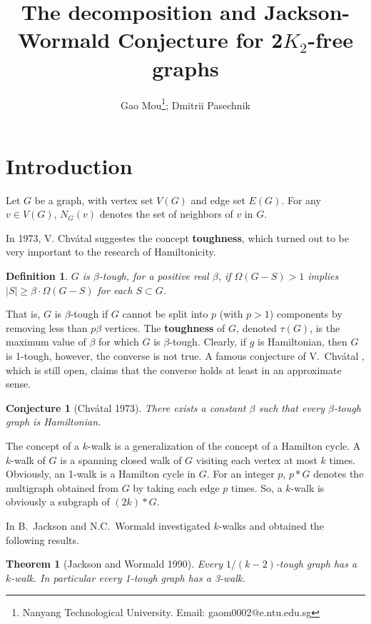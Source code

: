 \documentclass[12pt]{article}
\author{Gao Mou\thanks{Nanyang Technological University. Email: gaom0002@e.ntu.edu.sg}; Dmitrii Pasechnik}
\title{The decomposition and Jackson-Wormald Conjecture for 2$K_2$-free graphs}
\newtheorem{theorem}{Theorem}
\newtheorem{conjecture}{Conjecture}
\newtheorem{definition}{Definition}
\begin{document}
\maketitle


\section{Introduction}

Let $G$ be a graph, with vertex set $V(G)$ and edge set $E(G)$. For any $v\in V(G)$, $N_G(v)$ denotes the set of neighbors of $v$ in $G$. 

In 1973, V. Chv\'{a}tal suggestes the concept {\bf toughness}, which turned out to be very important to the research of Hamiltonicity.
\begin{definition}
$G$ is $\beta$-{\em tough},
for a positive real $\beta$, if $\Omega(G-S)>1$ implies $|S|\ge \beta\cdot \Omega(G-S)$ 
for each $S\subset G$.
\end{definition}

That is, $G$ is $\beta$-tough if
$G$ cannot be split into $p$ (with $p>1$) components by removing less than
$p\beta$ vertices.  The {\bf toughness} of $G$, denoted $\tau(G)$, is the maximum
value of $\beta$ for which $G$ is $\beta$-tough.  Clearly, if $g$ is
Hamiltonian, then $G$ is 1-tough, however, the converse is not true.  A famous
conjecture of V.~Chv\'{a}tal \cite{chvatal1973tough}, which is still open, claims
that the converse holds at least in an approximate sense.
\begin{conjecture}[Chv\'{a}tal 1973]\label{conj1} There exists a constant $\beta$ such that every
$\beta$-tough graph is Hamiltonian.  \end{conjecture}

The concept of a $k$-walk is a generalization of the concept of a Hamilton cycle.
A $k$-walk of $G$ is a spanning closed walk of $G$ visiting each vertex at most $k$ times.  Obviously, an 1-walk is a Hamilton cycle in $G$.
For an integer $p$, $p*G$ denotes the multigraph obtained from $G$ by taking each edge $p$ times. So, a $k$-walk is obviously a subgraph of $(2k)*G$. 

In \cite{jackson1990k} B.~Jackson and N.C.~Wormald investigated $k$-walks and obtained the following results.
\begin{theorem}[Jackson and Wormald 1990]\label{cthm1}
Every $1/(k-2)$-tough graph has a $k$-walk. 
In particular every 1-tough graph has a 3-walk. 
\end{theorem}
\end{document}
